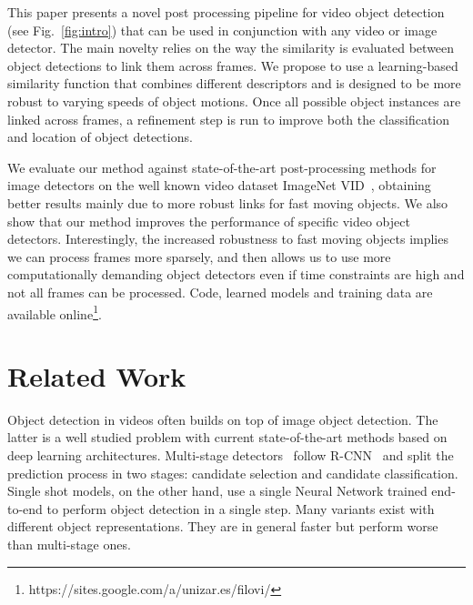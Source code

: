 \documentclass[letterpaper, 10 pt, conference]{ieeeconf}
\begin{document}
This paper presents a novel post processing pipeline for video object detection (see Fig.~\ref{fig:intro}) that can be used in conjunction with any video or image detector. The main novelty relies on the way the similarity is evaluated between object detections to link them across frames. We propose to use a learning-based similarity function that combines different descriptors and is designed to be more robust to varying speeds of object motions. 
Once all possible object instances are linked across frames, a refinement step is run to improve both the classification and location of object detections.

We evaluate our method against state-of-the-art post-processing methods for image detectors on the well known video dataset ImageNet VID~\cite{ILSVRC15}, obtaining better results mainly due to more robust links for fast moving objects. We also show that our method improves the performance of specific video object detectors. Interestingly, the increased robustness to fast moving objects implies we can process frames more sparsely, and then  allows us to use more computationally demanding object detectors even if time constraints are high and not all frames can be processed. Code, learned models and training data are available online\footnote{https://sites.google.com/a/unizar.es/filovi/}.







\section{Related Work}







Object detection in videos often builds on top of image object detection. The latter is a well studied problem with current state-of-the-art methods based on deep learning architectures. Multi-stage detectors~\cite{ren2015faster, R-FCN:NIPS2016} follow R-CNN~\cite{DBLP:journals/corr/GirshickDDM13} and split the prediction process in two stages: candidate selection and candidate classification. Single shot models, on the other hand, use a single Neural Network trained end-to-end to perform object detection in a single step. Many variants exist \cite{liu2016ssd,redmon2016you, Law_2018_ECCV,Zhou_2019_CVPR, zhou2019objects} with different object representations. They are in general faster but perform worse than multi-stage ones. 
\end{document}

